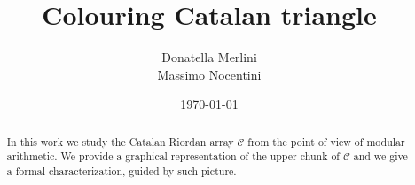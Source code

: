 \documentclass[11pt,a4paper]{article} %
\begin{document}

    \title{Colouring Catalan triangle}
    \author{Donatella Merlini\\
            Massimo Nocentini}

    \date{\today} 
    
    \maketitle
    
    \begin{abstract}
        In this work we study the Catalan Riordan array $\mathcal{C}$ from the
        point of view of modular arithmetic. We provide a graphical
        representation of the upper chunk of $\mathcal{C}$ and we give
        a formal characterization, guided by such picture.
    \end{abstract}
       

    
    
    
    
    

    
    

    \newpage
    
\end{document}
